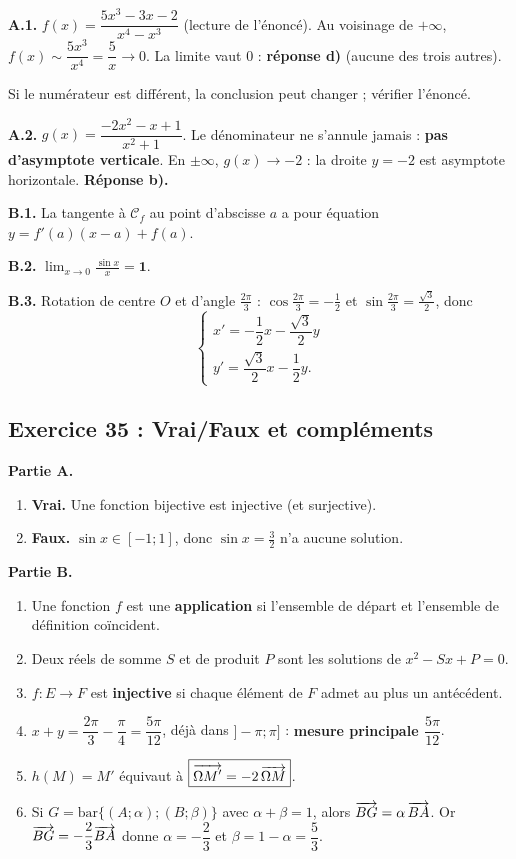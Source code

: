 \textbf{A.1.} $f(x)=\dfrac{5x^3-3x-2}{x^4-x^3}$ (lecture de l'\'enonc\'e). Au voisinage de $+\infty$, $f(x)\sim\dfrac{5x^3}{x^4}=\dfrac5x\to0$.
La limite vaut $0$ : \textbf{r\'eponse d)} (aucune des trois autres).
\begin{rem} Si le num\'erateur est diff\'erent, la conclusion peut changer ; v\'erifier l'\'enonc\'e.\end{rem}

\textbf{A.2.} $g(x)=\dfrac{-2x^2-x+1}{x^2+1}$. Le d\'enominateur ne s'annule jamais : \textbf{pas d'asymptote verticale}.
En $\pm\infty$, $g(x)\to-2$ : la droite $y=-2$ est asymptote horizontale. \textbf{R\'eponse b).}

\textbf{B.1.} La tangente \`a $\mathcal C_f$ au point d'abscisse $a$ a pour \'equation $\boxed{y=f'(a)(x-a)+f(a)}$.

\textbf{B.2.} $\displaystyle\lim_{x\to0}\frac{\sin x}{x}=\mathbf{1}$.

\textbf{B.3.} Rotation de centre $O$ et d'angle $\frac{2\pi}{3}$ : $\cos\frac{2\pi}{3}=-\frac12$ et $\sin\frac{2\pi}{3}=\frac{\sqrt3}{2}$, donc
\[
\begin{cases}
x'=-\dfrac12x-\dfrac{\sqrt3}{2}y\\[6pt]
y'=\dfrac{\sqrt3}{2}x-\dfrac12y.
\end{cases}
\]

\subsection{Exercice 35 : Vrai/Faux et compl\'ements}

\textbf{Partie A.}
\begin{enumerate}
  \item \textbf{Vrai.} Une fonction bijective est injective (et surjective).
  \item \textbf{Faux.} $\sin x\in[-1;1]$, donc $\sin x=\frac32$ n'a aucune solution.
\end{enumerate}

\textbf{Partie B.}
\begin{enumerate}
  \item Une fonction $f$ est une \textbf{application} si l'ensemble de d\'epart et l'ensemble de d\'efinition coïncident.
  \item Deux r\'eels de somme $S$ et de produit $P$ sont les solutions de $\boxed{x^2-Sx+P=0}$.
  \item $f:E\to F$ est \textbf{injective} si chaque \'el\'ement de $F$ admet au plus un ant\'ec\'edent.
  \item $x+y=\dfrac{2\pi}{3}-\dfrac{\pi}{4}=\dfrac{5\pi}{12}$, d\'ej\`a dans $]-\pi;\pi]$ : \textbf{mesure principale $\dfrac{5\pi}{12}$}.
  \item $h(M)=M'$ \'equivaut \`a $\boxed{\overrightarrow{\Omega M'}=-2\,\overrightarrow{\Omega M}}$.
  \item Si $G=\mathrm{bar}\{(A;\alpha);(B;\beta)\}$ avec $\alpha+\beta=1$, alors $\overrightarrow{BG}=\alpha\,\overrightarrow{BA}$.
  Or $\overrightarrow{BG}=-\dfrac23\overrightarrow{BA}$ donne $\alpha=-\dfrac23$ et $\beta=1-\alpha=\dfrac53$.
\end{enumerate}

